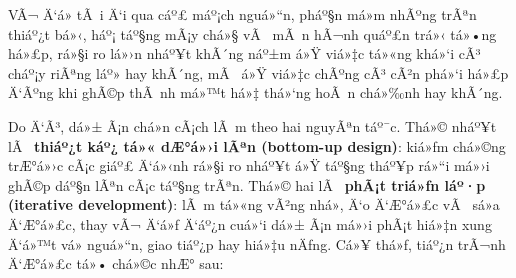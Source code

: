 \documentclass[a4paper]{extarticle}
\begin{document}
VÃ¬ Ä‘á» tÃ i Ä‘i qua cáº£ máº¡ch nguá»“n, pháº§n má»m nhÃºng trÃªn thiáº¿t bá»‹, háº¡ táº§ng
mÃ¡y chá»§ vÃ  mÃ n hÃ¬nh quáº£n trá»‹ tá»•ng há»£p, rá»§i ro lá»›n nháº¥t khÃ´ng náº±m á»Ÿ viá»‡c tá»«ng khá»‘i cÃ³ cháº¡y
riÃªng láº» hay khÃ´ng, mÃ  á»Ÿ viá»‡c chÃºng cÃ³ cÃ²n phá»‘i há»£p Ä‘Ãºng khi ghÃ©p thÃ nh
má»™t há»‡ thá»‘ng hoÃ n chá»‰nh hay khÃ´ng.

Do Ä‘Ã³, dá»± Ã¡n chá»n cÃ¡ch lÃ m theo hai nguyÃªn táº¯c. Thá»© nháº¥t lÃ  \textbf{thiáº¿t
káº¿ tá»« dÆ°á»›i lÃªn (bottom-up design)}: kiá»ƒm chá»©ng trÆ°á»›c cÃ¡c giáº£ Ä‘á»‹nh rá»§i ro
nháº¥t á»Ÿ táº§ng tháº¥p rá»“i má»›i ghÃ©p dáº§n lÃªn cÃ¡c táº§ng trÃªn. Thá»© hai lÃ 
\textbf{phÃ¡t triá»ƒn láº·p (iterative development)}: lÃ m tá»«ng vÃ²ng nhá», Ä‘o
Ä‘Æ°á»£c vÃ  sá»­a Ä‘Æ°á»£c, thay vÃ¬ Ä‘á»ƒ Ä‘áº¿n cuá»‘i dá»± Ã¡n má»›i phÃ¡t hiá»‡n xung Ä‘á»™t vá»
nguá»“n, giao tiáº¿p hay hiá»‡u nÄƒng. Cá»¥ thá»ƒ, tiáº¿n trÃ¬nh Ä‘Æ°á»£c tá»• chá»©c nhÆ° sau:
\end{document}
